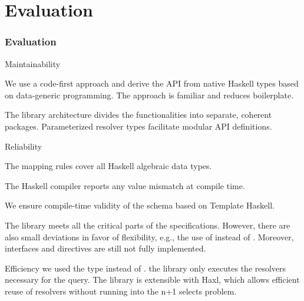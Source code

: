 \section{Evaluation}

\begin{frame}[allowframebreaks]\frametitle{Evaluation}

\begin{block}{Maintainability}

  \begin{itemize}
  
     We use a code-first approach and derive the API from native Haskell types based on data-generic programming. The approach is familiar and reduces boilerplate.

    The library architecture divides the functionalities into separate, coherent packages. Parameterized resolver types facilitate modular API definitions.

  \end{itemize}

\end{block}


\begin{block}{Reliability}

\begin{itemize}

    \begin{enumerate}

       The mapping rules cover all Haskell algebraic data types.

       The Haskell compiler reports any value mismatch at compile time.
      
       We ensure compile-time validity of the schema based on Template Haskell. 
    
    \end{enumerate}

   The library meets all the critical parts of the specifications. However, there are also small deviations in favor of flexibility, e.g., the use of  instead of . Moreover, interfaces and directives are still not fully implemented. 

\end{itemize}

\end{block}

\begin{block}{Efficiency} we used the type  instead of . the library only executes the resolvers necessary for the query. The library is extensible with Haxl, which allows efficient reuse of resolvers without running into the n+1 selects problem.

\end{block}
\end{frame}

